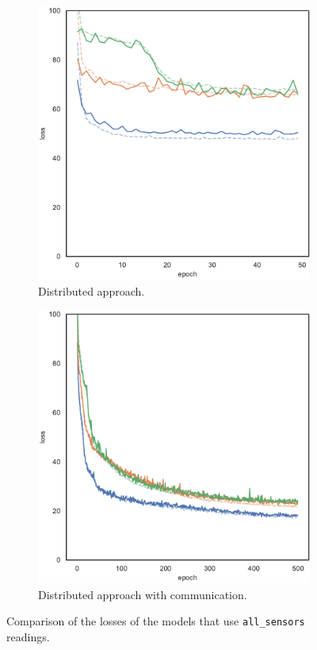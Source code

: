 \begin{figure}[!htb]
	\begin{center}
			\begin{subfigure}[h]{0.49\textwidth}
			\centering
			\includegraphics[width=.7\textwidth]{contents/images/task1-comm/loss-distributed-all_sensors@copy}
			\caption{Distributed approach.}
		\end{subfigure}
		\hfill
		\begin{subfigure}[h]{0.49\textwidth}
			\centering
			\includegraphics[width=.7\textwidth]{contents/images/task1-comm/loss-communication-all_sensors@copy}
			\caption{Distributed approach with communication.}
		\end{subfigure}	
	\end{center}
	\vspace{-0.5cm}
	\caption{Comparison of the losses of the models that use \texttt{all\_sensors} 
		readings.}
	\label{fig:commlossall_sensors}
\end{figure}

